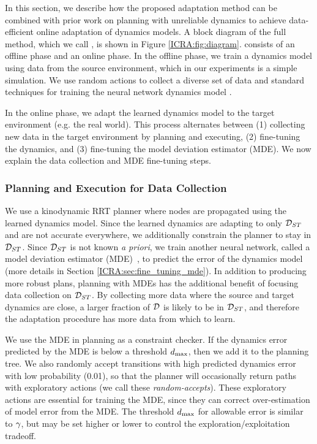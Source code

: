 In this section, we describe how the proposed adaptation method can be combined with prior work on planning with unreliable dynamics to achieve data-efficient online adaptation of dynamics models. A block diagram of the full method, which we call \FOCUS{}, is shown in Figure \ref{ICRA:fig:diagram}. \FOCUS{} consists of an offline phase and an online phase. In the offline phase, we train a dynamics model using data from the source environment, which in our experiments is a simple simulation. We use random actions to collect a diverse set of data and standard techniques for training the neural network dynamics model \cite{UnreliableMitrano2021}.

In the online phase, we adapt the learned dynamics model to the target environment (e.g. the real world). This process alternates between (1) collecting new data in the target environment by planning and executing, (2) fine-tuning the dynamics, and (3) fine-tuning the model deviation estimator (MDE). We now explain the data collection and MDE fine-tuning steps.

\subsubsection{Planning and Execution for Data Collection}

We use a kinodynamic RRT planner where nodes are propagated using the learned dynamics model. Since the learned dynamics are adapting to only $\mathcal{D}_{ST}$ and are not accurate everywhere, we additionally constrain the planner to stay in $\mathcal{D}_{ST}$. Since $\mathcal{D}_{ST}$ is not known \textit{a priori}, we train another neural network, called a model deviation estimator (MDE)~\cite{MDEs22, UnreliableDale2019, UnreliableMitrano2021}, to predict the error of the dynamics model (more details in Section \ref{ICRA:sec:fine_tuning_mde}). In addition to producing more robust plans, planning with MDEs has the additional benefit of focusing data collection on $\mathcal{D}_{ST}$. By collecting more data where the source and target dynamics are close, a larger fraction of $\mathcal{D}$ is likely to be in $\mathcal{D}_{ST}$, and therefore the adaptation procedure has more data from which to learn.

We use the MDE in planning as a constraint checker. If the dynamics error predicted by the MDE is below a threshold $d_\text{max}$, then we add it to the planning tree. We also randomly accept transitions with high predicted dynamics error with low probability (0.01), so that the planner will occasionally return paths with exploratory actions (we call these \textit{random-accepts}). These exploratory actions are essential for training the MDE, since they can correct over-estimation of model error from the MDE. The threshold $d_\text{max}$ for allowable error is similar to $\gamma$, but may be set higher or lower to control the exploration/exploitation tradeoff.


